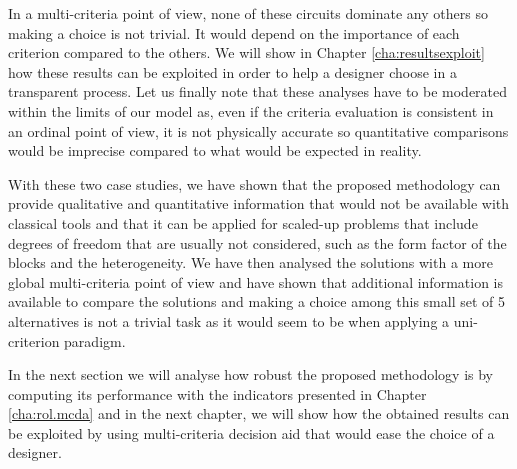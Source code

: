 In a multi-criteria point of view, none of these circuits dominate any others so making a choice is not trivial. It would depend on the importance of each criterion compared to the others. We will show in Chapter \ref{cha:resultsexploit} how these results can be exploited in order to help a designer choose in a transparent process. Let us finally note that these analyses have to be moderated within the limits of our model as, even if the criteria evaluation is consistent in an ordinal point of view, it is not physically accurate so quantitative comparisons would be imprecise compared to what would be expected in reality.

With these two case studies, we have shown that the proposed methodology can provide qualitative and quantitative information that would not be available with classical tools and that it can be applied for scaled-up problems that include degrees of freedom that are usually not considered, such as the form factor of the blocks and the heterogeneity. We have then analysed the solutions with a more global multi-criteria point of view and have shown that additional information is available to compare the solutions and making a choice among this small set of 5 alternatives is not a trivial task as it would seem to be when applying a uni-criterion paradigm.

In the next section we will analyse how robust the proposed methodology is by computing its performance with the indicators presented in Chapter \ref{cha:rol.mcda} and in the next chapter, we will show how the obtained results can be exploited by using multi-criteria decision aid that would ease the choice of a designer.



